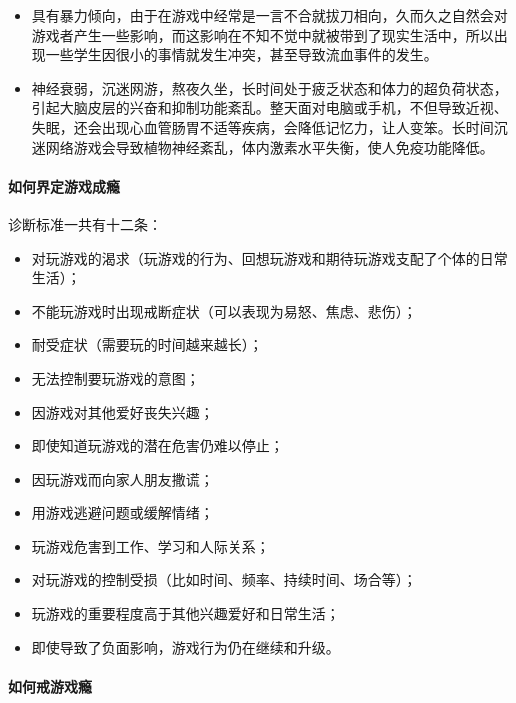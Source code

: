 \begin{multicols}{2}
\begin{itemize}
        \item 具有暴力倾向，由于在游戏中经常是一言不合就拔刀相向，久而久之自然会对游戏者产生一些影响，而这影响在不知不觉中就被带到了现实生活中，所以出现一些学生因很小的事情就发生冲突，甚至导致流血事件的发生。
        \item 神经衰弱，沉迷网游，熬夜久坐，长时间处于疲乏状态和体力的超负荷状态，引起大脑皮层的兴奋和抑制功能紊乱。整天面对电脑或手机，不但导致近视、失眠，还会出现心血管肠胃不适等疾病，会降低记忆力，让人变笨。长时间沉迷网络游戏会导致植物神经紊乱，体内激素水平失衡，使人免疫功能降低。
    \end{itemize}
\end{multicols}

\paragraph{如何界定游戏成瘾}

诊断标准一共有十二条：

\begin{multicols}{2}
    \begin{itemize}
        \item 对玩游戏的渴求（玩游戏的行为、回想玩游戏和期待玩游戏支配了个体的日常生活）；
        \item 不能玩游戏时出现戒断症状（可以表现为易怒、焦虑、悲伤）；
        \item 耐受症状（需要玩的时间越来越长）；
        \item 无法控制要玩游戏的意图；
        \item 因游戏对其他爱好丧失兴趣；
        \item 即使知道玩游戏的潜在危害仍难以停止；
        \item 因玩游戏而向家人朋友撒谎；
        \item 用游戏逃避问题或缓解情绪；
        \item 玩游戏危害到工作、学习和人际关系；
        \item 对玩游戏的控制受损（比如时间、频率、持续时间、场合等）；
        \item 玩游戏的重要程度高于其他兴趣爱好和日常生活；
        \item 即使导致了负面影响，游戏行为仍在继续和升级。
    \end{itemize}
\end{multicols}

\paragraph{如何戒游戏瘾}

